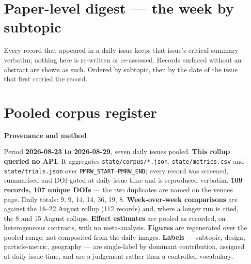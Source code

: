 \documentclass[10pt]{article}
\begin{document}
\clearpage

\section*{\sffamily\bfseries\color{Deep}Paper-level digest --- the week by subtopic}
\vspace{-1.5mm}{\color{Teal}\rule{\linewidth}{1.1pt}}\vspace{1mm}

{\fontsize{7.4}{9}\selectfont\color{Slate}Every record that appeared in a daily issue
keeps that issue's critical summary verbatim; nothing here is re-written or re-assessed.
Records surfaced without an abstract are shown as such. Ordered by subtopic, then by the
date of the issue that first carried the record.\par}



\clearpage

\section*{\sffamily\bfseries\color{Deep}Pooled corpus register}
\vspace{-1.5mm}{\color{Teal}\rule{\linewidth}{1.1pt}}\vspace{2.5mm}



\vspace{4mm}
\begin{keybox}
{\sffamily\bfseries\footnotesize\color{Deep}Provenance and method}\\[1.2mm]
{\fontsize{7.2}{8.8}\selectfont
Period \textbf{2026-08-23 to 2026-08-29}, seven daily issues pooled.
\textbf{This rollup queried no API.} It aggregates \texttt{state/corpus/*.json},
\texttt{state/metrics.csv} and \texttt{state/trials.json} over
\texttt{PMRW\_START}--\texttt{PMRW\_END}; every record was screened, summarised and
DOI-gated at daily-issue time and is reproduced verbatim. \textbf{109 records, 107 unique
DOIs} --- the two duplicates are named on the venues page. Daily totals: 9, 9, 14, 14, 36,
19, 8. \textbf{Week-over-week comparisons} are against the 16--22 August rollup
(112 records) and, where a longer run is cited, the 8 and 15 August rollups.
\textbf{Effect estimates} are pooled as recorded, on heterogeneous contrasts, with no
meta-analysis. \textbf{Figures} are regenerated over the pooled range, not composited from
the daily images. \textbf{Labels} --- subtopic, design, particle-metric, geography --- are
single-label by dominant contribution, assigned at daily-issue time, and are a judgement
rather than a controlled vocabulary.\par}
\end{keybox}
\end{document}

